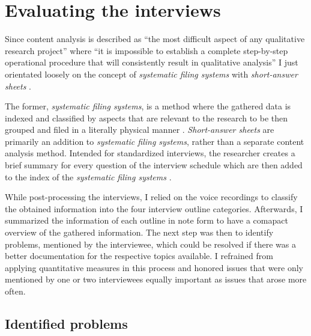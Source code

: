 \section{Evaluating the interviews}

Since content analysis is described as \enquote{the most difficult aspect of any qualitative research project} where \enquote{it is impossible to establish a complete step-by-step operational procedure that will consistently result in qualitative analysis} \cite[p. 102]{berg01} I just orientated loosely on the concept of \textit{systematic filing systems} \cite[p. 103]{berg01} with \textit{short-answer sheets} \cite[p. 105]{berg01}.

The former, \textit{systematic filing systems}, is a method where the gathered data is indexed and classified by aspects that are relevant to the research to be then grouped and filed in a literally physical manner \cite[p. 103]{berg01}. \textit{Short-answer sheets} are primarily an addition to \textit{systematic filing systems}, rather than a separate content analysis method. Intended for standardized interviews, the researcher creates a brief summary for every question of the interview schedule which are then added to the index of the \textit{systematic filing systems} \cite[p. 105]{berg01}.

While post-processing the interviews, I relied on the voice recordings to classify the obtained information into the four interview outline categories. Afterwards, I summarized the information of each outline in note form to have a comapact overview of the gathered information. The next step was then to identify problems, mentioned by the interviewee, which could be resolved if there was a better documentation for the respective topics available. I refrained from applying quantitative measures in this process and honored issues that were only mentioned by one or two interviewees equally important as issues that arose more often.

\subsection{Identified problems}


